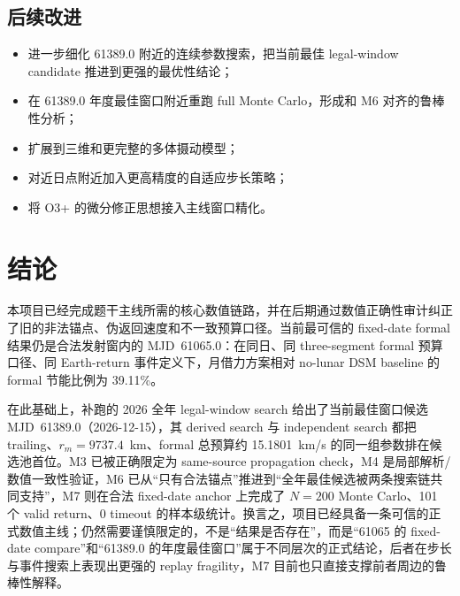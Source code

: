 \documentclass[12pt,a4paper]{ctexart}
\begin{document}
\subsection{后续改进}
\begin{itemize}
    \item 进一步细化 61389.0 附近的连续参数搜索，把当前最佳 legal-window candidate 推进到更强的最优性结论；
    \item 在 61389.0 年度最佳窗口附近重跑 full Monte Carlo，形成和 M6 对齐的鲁棒性分析；
    \item 扩展到三维和更完整的多体摄动模型；
    \item 对近日点附近加入更高精度的自适应步长策略；
    \item 将 O3+ 的微分修正思想接入主线窗口精化。
\end{itemize}

\newpage

\section{结论}
本项目已经完成题干主线所需的核心数值链路，并在后期通过数值正确性审计纠正了旧的非法锚点、伪返回速度和不一致预算口径。当前最可信的 fixed-date formal 结果仍是合法发射窗内的 MJD~61065.0：在同日、同 three-segment formal 预算口径、同 Earth-return 事件定义下，月借力方案相对 no-lunar DSM baseline 的 formal 节能比例为 39.11\%。

在此基础上，补跑的 2026 全年 legal-window search 给出了当前最佳窗口候选 MJD~61389.0（2026-12-15），其 derived search 与 independent search 都把 trailing、$r_m=9737.4$~km、formal 总预算约 15.1801~km/s 的同一组参数排在候选池首位。M3 已被正确限定为 same-source propagation check，M4 是局部解析/数值一致性验证，M6 已从“只有合法锚点”推进到“全年最佳候选被两条搜索链共同支持”，M7 则在合法 fixed-date anchor 上完成了 $N=200$ Monte Carlo、101 个 valid return、0 timeout 的样本级统计。换言之，项目已经具备一条可信的正式数值主线；仍然需要谨慎限定的，不是“结果是否存在”，而是“61065 的 fixed-date compare”和“61389.0 的年度最佳窗口”属于不同层次的正式结论，后者在步长与事件搜索上表现出更强的 replay fragility，M7 目前也只直接支撑前者周边的鲁棒性解释。
\end{document}
